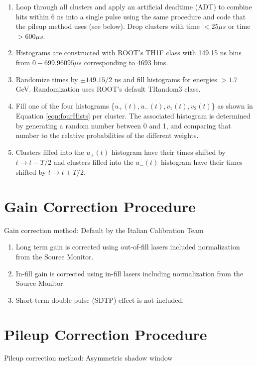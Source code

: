 \begin{enumerate}
	\item{Loop through all clusters and apply an artificial deadtime (ADT) to combine hits within 6 ns into a single pulse using the same procedure and code that the pileup method uses (see below). Drop clusters with time $< 25 \mu s$ or time $> 600 \mu s$.}
	\item{Histograms are constructed with ROOT's TH1F class with 149.15 ns bins from $0 - 699.96095 \mu s$ corresponding to 4693 bins.}
	\item{Randomize times by $\pm 149.15/2$ ns and fill histograms for energies $> 1.7$ GeV. Randomization uses ROOT's default TRandom3 class.}
	\item{Fill one of the four histograms \{$u_{+}(t), u_{-}(t), v_{1}(t), v_{2}(t)$\} as shown in Equation \ref{eqn:fourHists} per cluster. The associated histogram is determined by generating a random number between 0 and 1, and comparing that number to the relative probabilities of the different weights.}
	\item{Clusters filled into the $u_{+}(t)$ histogram have their times shifted by $t \rightarrow t - T/2$ and clusters filled into the $u_{-}(t)$ histogram have their times shifted by $t \rightarrow t + T/2$.}
\end{enumerate}


\section{Gain Correction Procedure}

Gain correction method: Default by the Italian Calibration Team

\begin{enumerate}
	\item{Long term gain is corrected using out-of-fill lasers included normalization from the Source Monitor.}
	\item{In-fill gain is corrected using in-fill lasers including normalization from the Source Monitor.}
	\item{Short-term double pulse (SDTP) effect is not included.}
\end{enumerate}


\section{Pileup Correction Procedure}

Pileup correction method: Asymmetric shadow window

